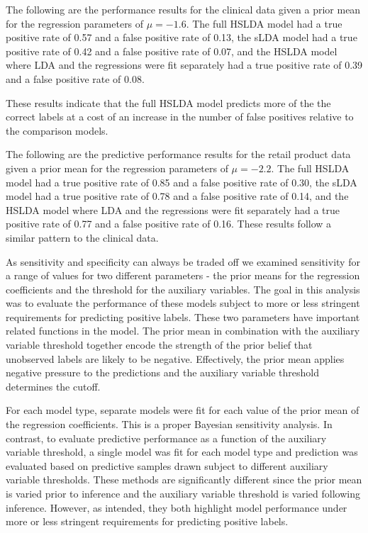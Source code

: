 The following are the performance results for the clinical
data given a prior mean for the regression parameters of $\mu=-1.6$. 
The full HSLDA model had a true positive rate of 0.57 
and a false positive rate of 0.13, the sLDA model had a true positive
rate of 0.42 and a false positive rate of 0.07, and the HSLDA model where
LDA and the regressions were fit separately had a true positive rate of 0.39
and a false positive rate of 0.08.

These results indicate that the full HSLDA model predicts more of the the
correct labels at a cost of an increase in the number of false positives
relative to the comparison models.

The following are the predictive performance results for the retail product
data given a prior mean for the regression parameters of $\mu=-2.2$. 
The full HSLDA model had a true positive rate of 0.85 
and a false positive rate of 0.30, the sLDA model had a true positive
rate of 0.78 and a false positive rate of 0.14, and the HSLDA model where
LDA and the regressions were fit separately had a true positive rate of 0.77
and a false positive rate of 0.16. These results follow a similar pattern to the clinical data.

As sensitivity and specificity can always be traded off we examined sensitivity for a range of values
for two different parameters - the prior means for the regression coefficients
and the threshold for the auxiliary variables.  The goal in this analysis
was to evaluate the performance of these models subject to more or less
stringent requirements for predicting positive labels. These two parameters 
have important related functions in the model. The prior mean in combination 
with the auxiliary variable threshold together encode the strength of the prior
belief that unobserved labels are likely to be negative. Effectively, the
prior mean applies negative pressure to the predictions and the auxiliary
variable threshold determines the cutoff.

For each model type, separate models were fit for each value of the 
prior mean of the regression coefficients.  This is a proper Bayesian
sensitivity analysis. In contrast, to evaluate
predictive performance as a function of the auxiliary variable threshold,
a single model was fit for each model type and prediction was evaluated
based on predictive samples drawn subject to different auxiliary variable
thresholds. These methods are significantly different since the prior mean
is varied prior to inference and the auxiliary variable threshold is varied
following inference.  However, as intended, they both highlight model performance
under more or less stringent requirements for predicting positive labels.

